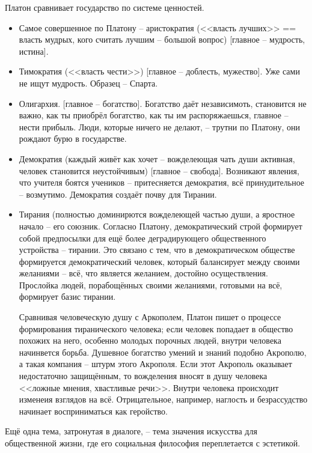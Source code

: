 \documentclass[a4paper, 12pt]{book} %
\begin{document}
Платон сравнивает государство по системе ценностей.

\begin{itemize}
\item Самое совершенное по Платону -- аристократия (<<власть лучших>> == власть мудрых, кого считать лучшим -- большой вопрос) [главное -- мудрость, истина].
\item Тимократия (<<власть чести>>) [главное -- доблесть, мужество]. Уже сами не ищут мудрость. Образец -- Спарта.
\item Олигархия. [главное -- богатство]. Богатство даёт независимоть, становится не важно, как ты приобрёл богатство, как ты им распоряжаешься, главное -- нести прибыль. Люди, которые ничего не делают, -- трутни по Платону, они рождают бурю в государстве.
\item Демократия (каждый живёт как хочет -- вожделеющая чать души активная, человек становится неустойчивым) [главное -- свобода]. Возникают явления, что учителя боятся учеников -- притесняется демократия, всё принудительное -- возмутимо. Демократия создаёт почву для Тирании.
\item Тирания (полностью доминирются вожделеющей частью души, а яростное начало -- его союзник. 
Согласно Платону, демократический строй формирует собой предпосылки для ещё более деградирующего общественного устройства -- тирании. Это связано с тем, что в демократическом обществе формируется демократический человек, который балансирует между своими желаниями --  всё, что является желанием, достойно осуществления. Прослойка людей, порабощённых своими желаниями, готовыми на всё, формирует базис тирании.

Сравнивая человеческую душу с Аркополем, Платон пишет о процессе формирования тиранического человека; если человек попадает в общество похожих на него, особенно молодых порочных людей, внутри человека начинвется борьба. 
Душевное богатство умений и знаний подобно Акрополю, а такая компания -- штурм этого Акрополя. Если этот Акрополь оказывает недостаточно защищённым, то вожделения вносят в душу человека <<ложные мнения, хвастливые речи>>. Внутри человека происходит изменеия взглядов на всё. Отрицательное, например, наглость и безрассудство начинает восприниматься как геройство. 

\end{itemize}

Ещё одна тема, затронутая в диалоге, -- тема значения искусства для общественной жизни, где его социальная философия переплетается с эстетикой. 
\end{document}
